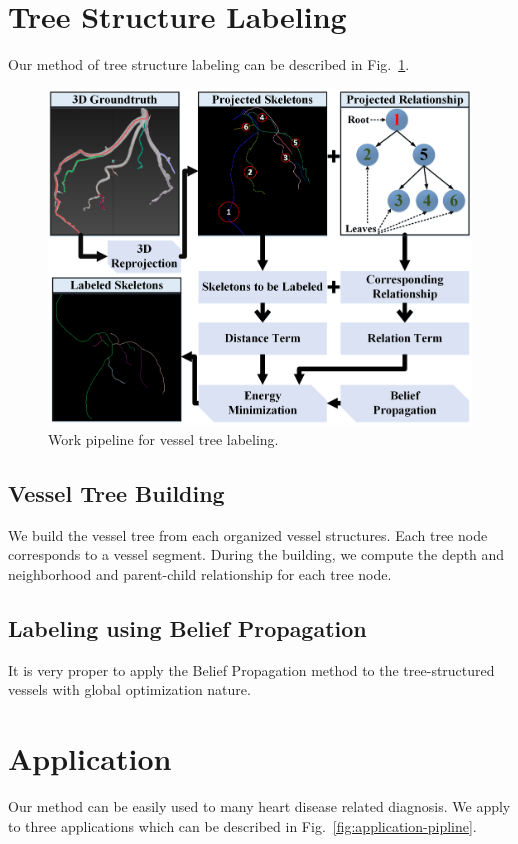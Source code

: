 \documentclass[journal]{IEEEtran}
\begin{document}
\section{Tree Structure Labeling}
\label{sec:tree-labeling}
Our method of tree structure labeling can be described in Fig.~\ref{fig:tree-labeling}.

\begin{figure}[!t]
\centering
\includegraphics[width=1.0\linewidth]{./images/labeling-pipeline.png}
\caption{Work pipeline for vessel tree labeling.}
\label{fig:tree-labeling}
\end{figure}

\subsection{Vessel Tree Building}
\label{subsec:vessel-tree-building}
We build the vessel tree from each organized vessel structures. Each tree node corresponds to a vessel segment. During the building, we compute the depth and neighborhood and parent-child relationship for each tree node.
\subsection{Labeling using Belief Propagation}
\label{subsec:labeling-using-bp}
It is very proper to apply the Belief Propagation method to the tree-structured vessels with global optimization nature.

\section{Application}
Our method can be easily used to many heart disease related diagnosis. We apply to three applications which can be described in Fig.~\ref{fig:application-pipline}.
\end{document}
